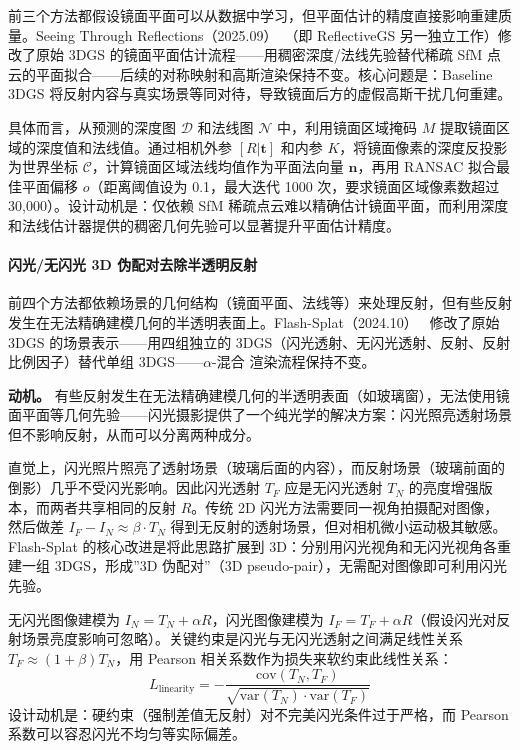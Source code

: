前三个方法都假设镜面平面可以从数据中学习，但平面估计的精度直接影响重建质量。Seeing Through Reflections（2025.09）~\cite{2509_18956}（即 ReflectiveGS 另一独立工作）修改了原始 3DGS 的镜面平面估计流程——用稠密深度/法线先验替代稀疏 SfM 点云的平面拟合——后续的对称映射和高斯渲染保持不变。核心问题是：Baseline 3DGS 将反射内容与真实场景等同对待，导致镜面后方的虚假高斯干扰几何重建。

具体而言，从预测的深度图 $\mathcal{D}$ 和法线图 $\mathcal{N}$ 中，利用镜面区域掩码 $M$ 提取镜面区域的深度值和法线值。通过相机外参 $[R|\mathbf{t}]$ 和内参 $K$，将镜面像素的深度反投影为世界坐标 $\mathcal{C}$，计算镜面区域法线均值作为平面法向量 $\mathbf{n}$，再用 RANSAC 拟合最佳平面偏移 $o$（距离阈值设为 0.1，最大迭代 1000 次，要求镜面区域像素数超过 30{,}000）。设计动机是：仅依赖 SfM 稀疏点云难以精确估计镜面平面，而利用深度和法线估计器提供的稠密几何先验可以显著提升平面估计精度。

\paragraph{闪光/无闪光 3D 伪配对去除半透明反射}

前四个方法都依赖场景的几何结构（镜面平面、法线等）来处理反射，但有些反射发生在无法精确建模几何的半透明表面上。Flash-Splat（2024.10）~\cite{2410_02764} 修改了原始 3DGS 的场景表示——用四组独立的 3DGS（闪光透射、无闪光透射、反射、反射比例因子）替代单组 3DGS——$\alpha$-混合 渲染流程保持不变。

\textbf{动机。} 有些反射发生在无法精确建模几何的半透明表面（如玻璃窗），无法使用镜面平面等几何先验——闪光摄影提供了一个纯光学的解决方案：闪光照亮透射场景但不影响反射，从而可以分离两种成分。

直觉上，闪光照片照亮了透射场景（玻璃后面的内容），而反射场景（玻璃前面的倒影）几乎不受闪光影响。因此闪光透射 $T_F$ 应是无闪光透射 $T_N$ 的亮度增强版本，而两者共享相同的反射 $R$。传统 2D 闪光方法需要同一视角拍摄配对图像，然后做差 $I_F - I_N \approx \beta \cdot T_N$ 得到无反射的透射场景，但对相机微小运动极其敏感。Flash-Splat 的核心改进是将此思路扩展到 3D：分别用闪光视角和无闪光视角各重建一组 3DGS，形成”3D 伪配对”（3D pseudo-pair），无需配对图像即可利用闪光先验。

无闪光图像建模为 $I_N = T_N + \alpha R$，闪光图像建模为 $I_F = T_F + \alpha R$（假设闪光对反射场景亮度影响可忽略）。关键约束是闪光与无闪光透射之间满足线性关系 $T_F \approx (1+\beta) T_N$，用 Pearson 相关系数作为损失来软约束此线性关系：
$$L_{\text{linearity}} = -\frac{\text{cov}(T_N, T_F)}{\sqrt{\text{var}(T_N) \cdot \text{var}(T_F)}}$$
设计动机是：硬约束（强制差值无反射）对不完美闪光条件过于严格，而 Pearson 系数可以容忍闪光不均匀等实际偏差。

